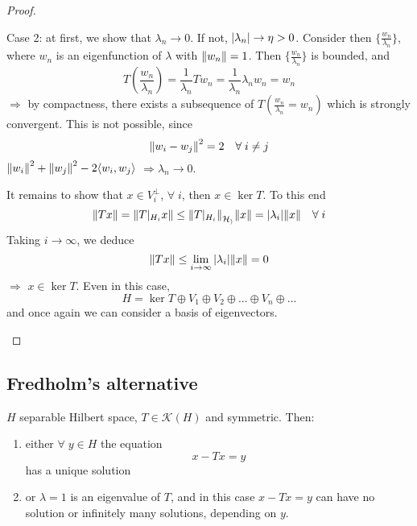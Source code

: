 \begin{proof}
\begin{itemize}
        Case 2: at first, we show that \(\lambda_n \to 0\). If not, \(\abs{\lambda_n} \to \eta > 0\). 
        Consider then \(\{\frac{w_n}{\lambda_n}\}\), where \(w_n\) is an eigenfunction of \(\lambda\) with \(\norm{w_n}=1\). Then \(\{\frac{w_n}{\lambda_n}\}\) is bounded, and
        \[
            T(\frac{w_n}{\lambda_n}) = \frac{1}{\lambda_n} T w_n = \frac{1}{\lambda_n} \lambda_n w_n = w_n
        \]
        \(\Rightarrow\) by compactness, there exists a subsequence of \(T(\frac{w_n}{\lambda_n}= w_n)\) which is strongly convergent.
        This is not possible, since
        \[
            \norm{w_i - w_j}^2 = 2 \quad \forall\; i \neq j
        \]
        \(\norm{w_i}^2 + \norm{w_j}^2 -2\langle w_i, w_j\rangle\) \(\Rightarrow \lambda_n \to 0\).

        It remains to show that \(x \in V_i^\perp\), \(\forall\; i\), then \(x \in \ker T\). To this end
        \[
            \norm{Tx} = \norm{T|_{H_i} x} \leq \norm{T|_{H_i}}_{\mathcal{H_i}} \norm{x} = \abs{\lambda_i} \norm{x} \quad \forall\;i 
        \]
        Taking \(i \to \infty\), we deduce
        \[
            \norm{Tx} \leq \lim_{i \to \infty} \abs{\lambda_i} \norm{x} = 0
        \]
        \(\Rightarrow\) \(x \in \ker T\). Even in this case, 
        \[
            H = \ker T \oplus V_1 \oplus V_2 \oplus ... \oplus V_n \oplus ...
        \]
        and once again we can consider a basis of eigenvectors.
    \end{itemize}
\end{proof}
\subsection{Fredholm's alternative}
\begin{corollary}
    \(H\) separable Hilbert space, \(T \in \mathcal{K}(H) \) and symmetric. Then:
    \begin{enumerate}
        \item either \(\forall\; y \in H\) the equation
        \[
            x - Tx = y
        \]
        has a unique solution
        \item or \(\lambda=1\) is an eigenvalue of \(T\), and in this case \(x - Tx = y\) can have no solution or infinitely many solutions, depending on \(y\).
    \end{enumerate}
\end{corollary}


